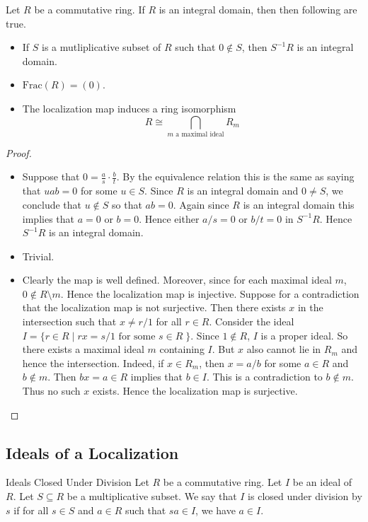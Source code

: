 \documentclass[a4paper]{article}
\begin{document}
\begin{lmm}{}{} Let $R$ be a commutative ring. If $R$ is an integral domain, then then following are true. 
\begin{itemize}
\item If $S$ is a mutliplicative subset of $R$ such that $0\notin S$, then $S^{-1}R$ is an integral domain. 
\item $\text{Frac}(R)=(0)$. 
\item The localization map induces a ring isomorphism $$R\cong\bigcap_{m\text{ a maximal ideal}}R_m$$
\end{itemize} 
\begin{proof}~\\
\begin{itemize}
\item Suppose that $0=\frac{a}{s}\cdot\frac{b}{t}$. By the equivalence relation this is the same as saying that $uab=0$ for some $u\in S$. Since $R$ is an integral domain and $0\neq S$, we conclude that $u\notin S$ so that $ab=0$. Again since $R$ is an integral domain this implies that $a=0$ or $b=0$. Hence either $a/s=0$ or $b/t=0$ in $S^{-1}R$. Hence $S^{-1}R$ is an integral domain. 
\item Trivial. 
\item Clearly the map is well defined. Moreover, since for each maximal ideal $m$, $0\notin R\setminus m$. Hence the localization map is injective. Suppose for a contradiction that the localization map is not surjective. Then there exists $x$ in the intersection such that $x\neq r/1$ for all $r\in R$.  Consider the ideal $I=\{r\in R\;|\;rx=s/1\text{ for some }s\in R\;\}$. Since $1\notin R$, $I$ is a proper ideal. So there exists a maximal ideal $m$ containing $I$. But $x$ also cannot lie in $R_m$ and hence the intersection. Indeed, if $x\in R_m$, then $x=a/b$ for some $a\in R$ and $b\notin m$. Then $bx=a\in R$ implies that $b\in I$. This is a contradiction to $b\notin m$. Thus no such $x$ exists. Hence the localization map is surjective. 
\end{itemize}
\end{proof}
\end{lmm}

\subsection{Ideals of a Localization}
\begin{defn}{Ideals Closed Under Division}{} Let $R$ be a commutative ring. Let $I$ be an ideal of $R$. Let $S\subseteq R$ be a multiplicative subset. We say that $I$ is closed under division by $s$ if for all $s\in S$ and $a\in R$ such that $sa\in I$, we have $a\in I$. 
\end{defn}
\end{document}
